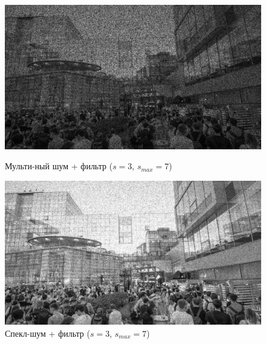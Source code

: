 \documentclass[a4paper]{article}
\begin{document}
\begin{figure}[H]
    \begin{minipage}{0.49\textwidth}
        \centering \includegraphics[width=\textwidth]{images/3_nonlinear_filters/multiplicative - adaptive median (s_start=3, s_max=7).jpg}
        \caption{Мульти-ный шум + фильтр ($s = 3$, $s_{max}=7$)}
    \end{minipage}\hfill
    \begin{minipage}{0.49\textwidth}
        \centering \includegraphics[width=\textwidth]{images/3_nonlinear_filters/speckle - adaptive median (s_start=3, s_max=7).jpg}
        \caption{Спекл-шум + фильтр ($s = 3$, $s_{max}=7$)}
    \end{minipage}
\end{figure}
\end{document}
